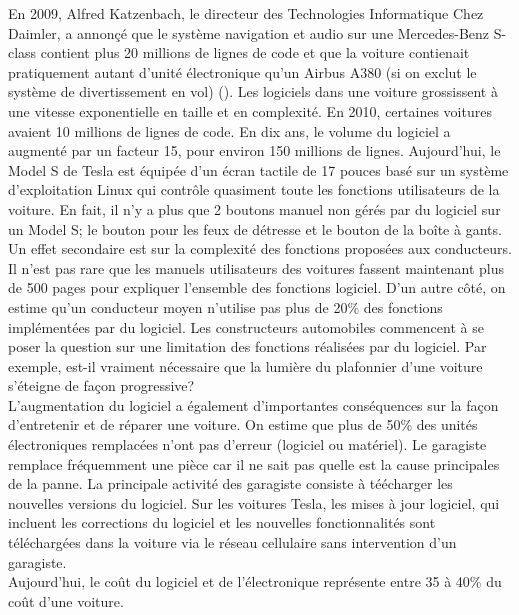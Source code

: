 En 2009, Alfred Katzenbach, le directeur des Technologies Informatique Chez Daimler, a annon\c c\'e que le syst\`eme navigation et audio sur une Mercedes-Benz  S-class contient plus 20 millions de lignes de code et que la voiture contienait pratiquement autant d'unit\'e \'electronique qu'un Airbus A380 (si on exclut le syst\`eme de divertissement en vol) (\cite{Cha09}).  Les logiciels dans une voiture grossissent \`a une vitesse exponentielle en taille et en complexit\'e. En 2010, certaines voitures avaient 10 millions de lignes de code. En dix ans, le volume du logiciel a augment\'e par un facteur 15, pour environ 150 millions de lignes. Aujourd'hui, le Model S de Tesla est \'equip\'ee d'un \'ecran tactile de 17 pouces bas\'e sur un syst\`eme d'exploitation Linux qui contr\^ole quasiment toute les fonctions utilisateurs de la voiture. En fait, il n'y a plus que 2 boutons manuel non g\'er\'es par du logiciel sur un Model S; le bouton pour les feux de d\'etresse et le bouton de la bo\^ite \`a gants. \\

Un effet secondaire est sur la complexit\'e des fonctions propos\'ees aux conducteurs. Il n'est pas rare que les manuels utilisateurs des voitures fassent maintenant plus de 500 pages pour expliquer l'ensemble des fonctions logiciel. D'un autre c\^ot\'e, on estime qu'un conducteur moyen n'utilise pas plus de 20\% des fonctions impl\'ement\'ees par du logiciel. Les constructeurs automobiles commencent \`a se poser la question sur une limitation des fonctions r\'ealis\'ees par du logiciel. Par exemple, est-il vraiment n\'ecessaire que la lumi\`ere du plafonnier d'une voiture s'\'eteigne de fa\c con progressive?\\

L'augmentation du logiciel a \'egalement d'importantes cons\'equences sur la fa\c con d'entretenir et de r\'eparer une voiture. On estime que plus de 50\% des unit\'es \'electroniques remplac\'ees n'ont pas d'erreur (logiciel ou mat\'eriel). Le garagiste remplace fr\'equemment une pi\`ece car il ne sait pas quelle est la cause principales de la panne. La principale activit\'e des garagiste consiste \`a t\'e\'echarger les nouvelles versions du logiciel. Sur les voitures Tesla, les mises \`a jour logiciel, qui incluent les corrections du logiciel et les nouvelles fonctionnalit\'es sont t\'el\'echarg\'ees dans la voiture via le r\'eseau cellulaire sans intervention d'un garagiste.\\  

Aujourd'hui, le co\^ut du logiciel et de l'\'electronique repr\'esente entre 35 \`a 40\% du co\^ut d'une voiture. \\


